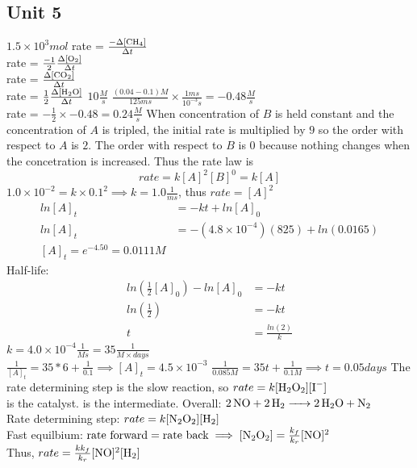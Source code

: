 \documentclass[../main.tex]{subfiles}
\begin{document}
\subsection{Unit 5}
\AnswerSet
\(1.5 \times 10^3mol\) 
\AnswerSet 
{} \hspace{0.5em} rate = \(\frac{-\Delta [\ce{CH4}]}{\Delta t}\) \\
 \hspace{0.5em} rate = \(\frac{-1}{2} \frac{\Delta [\ce{O2}]}{\Delta t}\) \\
 \hspace{0.5em} rate = \(\frac{\Delta [\ce{CO2}]}{\Delta t}\) \\
 \hspace{0.5em} rate = \(\frac{1}{2} \frac{\Delta [\ce{H2O}]}{\Delta t}\)
\AnswerSet
\(10\frac{M}{s}\)
\AnswerSet
\(\frac{(0.04 - 0.1)M}{125ms} \times \frac{1ms}{10^{-3}s} = -0.48 \frac{M}{s}\)\\
rate = \(-\frac{1}{2} \times -0.48 = 0.24 \frac{M}{s}\)
\AnswerSet
When concentration of \(B\) is held constant and the concentration of \(A\) is tripled, the initial rate is multiplied by \(9\) so the order with respect to \(A\)
is \(2\). The order with respect to \(B\) is \(0\) because nothing changes when the concetration is increased. Thus the rate law is 
\begin{equation*}
    rate = k[A]^2[B]^0 = k[A]
\end{equation*}
\(1.0 \times 10^{-2} = k \times 0.1^2 \implies k = 1.0 \frac{1}{ms}\), thus \(rate = [A]^2\)
\AnswerSet
\begin{equation*}
    \begin{aligned}
    ln[A]_t &= -kt + ln[A]_0 \\
    ln[A]_t &= -(4.8 \times 10^{-4})(825) + ln(0.0165)\\
    [A]_t = e^{-4.50} = 0.0111M 
    \end{aligned}
\end{equation*}
Half-life:
\begin{equation*}
    \begin{aligned}
        ln(\frac{1}{2}[A]_0) - ln[A]_0 &= -kt \\
        ln(\frac{1}{2}) &= -kt \\
        t &= \frac{ln(2)}{k}
    \end{aligned}
\end{equation*}
\AnswerSet
\(k = 4.0 \times 10^{-4} \frac{1}{Ms} = 35\frac{1}{M\times days}\) \\
\(\frac{1}{[A]_t} = 35 * 6 + \frac{1}{0.1} \implies [A]_t = 4.5 \times 10^{-3}\)
\AnswerSet
\(\frac{1}{0.085M} = 35t + \frac{1}{0.1M} \implies t = 0.05days\)
\AnswerSet
{} 
The rate determining step is the slow reaction, so \(rate = k[\ce{H2O2}][\ce{I-}]\)\\
 is the catalyst.  is the intermediate. 
\AnswerSet
Overall: \(\ce{2NO + 2H2 -> 2H2O + N2} \)\\
Rate determining step: \(rate = k[\ce{N2O2}][\ce{H2}]\) \\
Fast equilbium: \(\text{rate forward} = \text{rate back} \implies [\ce{N2O2}] = \frac{k_f}{k_r}[\ce{NO}]^2\) \\
Thus, \(rate = \frac{kk_f}{k_r}[\ce{NO}]^2[\ce{H2}]\)
\end{document}
